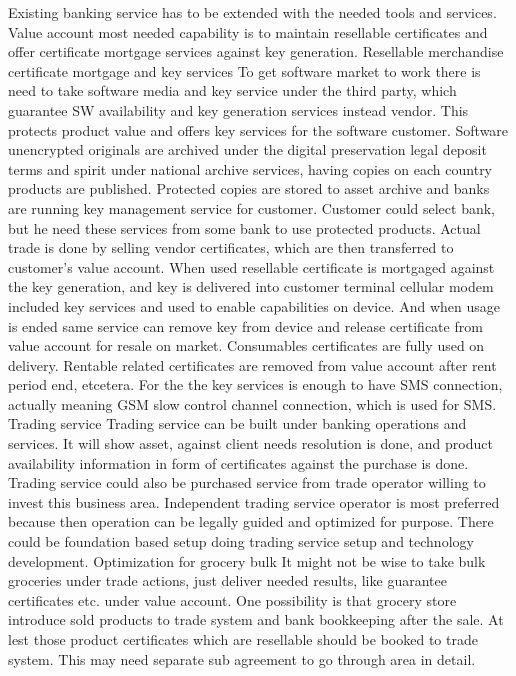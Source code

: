 Existing banking service has to be extended with the needed tools and services. Value account most needed capability is to maintain resellable certificates and offer certificate mortgage services against key generation.
Resellable merchandise certificate mortgage and key services
To get software market to work there is need to take software media and key service under the third party, which guarantee SW availability and key generation services instead vendor. This protects product value and offers key services for the software customer. Software unencrypted originals are archived under the digital preservation legal deposit\cite{EULegalDepositScheme} terms and spirit under national archive services, having copies on each country products are published. Protected copies are stored to asset archive and banks are running key management service for customer. Customer could select bank, but he need these services from some bank to use protected products. Actual trade is done by selling vendor certificates, which are then transferred to customer's value account. When used resellable certificate is mortgaged against the key generation, and key is delivered into customer terminal cellular modem included key services and used to enable capabilities on device. And when usage is ended same service can remove key from device and release certificate from value account for resale on market. Consumables certificates are fully used on delivery. Rentable related certificates are removed from value account after rent period end, etcetera. For the the key services is enough to have SMS connection, actually meaning GSM slow control channel connection, which is used for SMS.
Trading service
Trading service can be built under banking operations and services. It will show asset, against client needs resolution is done, and product availability information in form of certificates against the purchase is done. Trading service could also be purchased service from trade operator willing to invest this business area. Independent trading service operator is most preferred because then operation can be legally guided and optimized for purpose. There could be foundation based setup doing trading service setup and technology development.
Optimization for grocery bulk
It might not be wise to take bulk groceries under trade actions, just deliver needed results, like guarantee certificates etc. under value account. One possibility is that grocery store introduce sold products to trade system and bank bookkeeping after the sale. At lest those product certificates which are resellable should be booked to trade system. This may need separate sub agreement to go through area in detail.

